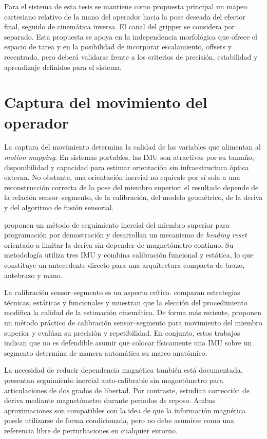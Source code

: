 Para el sistema de esta tesis se mantiene como propuesta principal un mapeo cartesiano relativo de la mano del operador hacia la pose deseada del efector final, seguido de cinemática inversa. El canal del gripper se considera por separado. Esta propuesta se apoya en la independencia morfológica que ofrece el espacio de tarea y en la posibilidad de incorporar escalamiento, offsets y recentrado, pero deberá validarse frente a los criterios de precisión, estabilidad y aprendizaje definidos para el sistema.

\section{Captura del movimiento del operador}

La captura del movimiento determina la calidad de las variables que alimentan al \textit{motion mapping}. En sistemas portables, las IMU son atractivas por su tamaño, disponibilidad y capacidad para estimar orientación sin infraestructura óptica externa. No obstante, una orientación inercial no equivale por sí sola a una reconstrucción correcta de la pose del miembro superior: el resultado depende de la relación sensor--segmento, de la calibración, del modelo geométrico, de la deriva y del algoritmo de fusión sensorial.

\textcite{pellois2022inertial} proponen un método de seguimiento inercial del miembro superior para programación por demostración y desarrollan un mecanismo de \textit{heading reset} orientado a limitar la deriva sin depender de magnetómetro continuo. Su metodología utiliza tres IMU y combina calibración funcional y estática, lo que constituye un antecedente directo para una arquitectura compacta de brazo, antebrazo y mano.

La calibración sensor--segmento es un aspecto crítico. \textcite{bouvier2015calibrations} comparan estrategias técnicas, estáticas y funcionales y muestran que la elección del procedimiento modifica la calidad de la estimación cinemática. De forma más reciente, \textcite{mcinnes2025calibration} proponen un método práctico de calibración sensor--segmento para movimiento del miembro superior y evalúan su precisión y repetibilidad. En conjunto, estos trabajos indican que no es defendible asumir que colocar físicamente una IMU sobre un segmento determina de manera automática su marco anatómico.

La necesidad de reducir dependencia magnética también está documentada. \textcite{laidig2022magfree} presentan seguimiento inercial auto-calibrable sin magnetómetro para articulaciones de dos grados de libertad. Por contraste, \textcite{wittmann2019drift} estudian corrección de deriva mediante magnetómetro durante periodos de reposo. Ambas aproximaciones son compatibles con la idea de que la información magnética puede utilizarse de forma condicionada, pero no debe asumirse como una referencia libre de perturbaciones en cualquier entorno.

